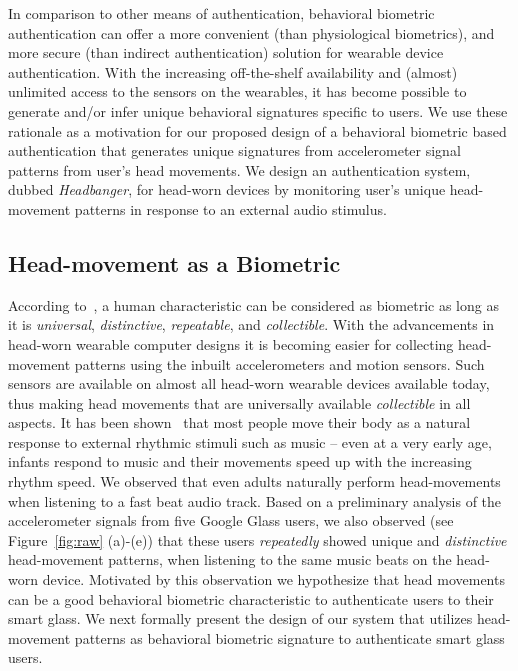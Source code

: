 In comparison to other means of authentication, behavioral biometric
authentication can offer a more convenient (than physiological biometrics),
and more secure (than indirect authentication) solution for wearable device
authentication. With the increasing off-the-shelf
availability and (almost) unlimited access to the sensors on the wearables, it
has become possible to generate and/or infer unique behavioral signatures
specific to users. We use these rationale as a motivation for our proposed
design of a behavioral biometric based authentication that generates unique
signatures from accelerometer signal patterns from user's head movements.
We design an authentication system, dubbed {\em Headbanger}, for head-worn
devices by monitoring user's unique head-movement patterns in response to an
external audio stimulus.

\subsection{Head-movement as a Biometric}
\label{subsec:headmovements}


According to~\cite{jain2004introduction}, a human characteristic can be
considered as biometric as long as it is \emph{universal}, \emph{distinctive},
\emph{repeatable}, and \emph{collectible}. With the advancements in head-worn
wearable computer designs it is becoming easier for collecting head-movement
patterns using the inbuilt accelerometers and motion sensors. Such sensors are
available on almost all head-worn wearable devices available today, thus
making head movements that are universally available {\em collectible} in all
aspects. It has been shown~\cite{zentner2010rhythmic} that most people move
their body as a natural response to external rhythmic stimuli such as music --
even at a very early age, infants respond to music and their movements speed
up with the increasing rhythm speed. We observed that even adults naturally
perform head-movements when listening to a fast beat audio track. Based on a
preliminary analysis of the accelerometer signals from five Google Glass
users, we also observed (see Figure~\ref{fig:raw} (a)-(e)) that these users
{\em repeatedly} showed unique and {\em distinctive} head-movement patterns,
when listening to the same music beats on the head-worn device.
Motivated by this observation we hypothesize that head movements
can be a good behavioral biometric characteristic to authenticate
users to their smart glass.
We next formally present the design of our system that
utilizes head-movement patterns as behavioral biometric signature
to authenticate smart glass users.

